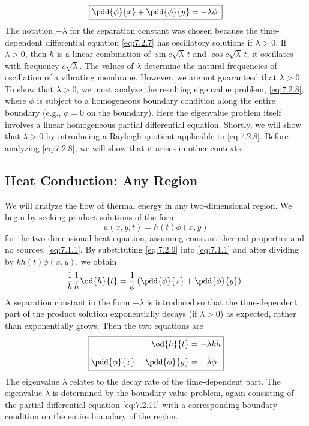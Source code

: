 \begin{equation}
\boxed{\pdd{\phi}{x} + \pdd{\phi}{y} = -\lambda\phi.}
\label{eq:7.2.8}
\end{equation}
The notation $-\lambda$ for the separation constant was chosen because the time-dependent differential equation \eqref{eq:7.2.7} has oscillatory solutions if $\lambda > 0$.  If $\lambda > 0$, then $h$ is a linear combination of $\sin c\sqrt{\lambda}\,t$ and $\cos c\sqrt{\lambda}\,t$; it oscillates with frequency $c\sqrt{\lambda}$.  The values of $\lambda$ determine the natural frequencies of oscillation of a vibrating membrane.  However, we are not guaranteed that $\lambda > 0$.  To show that $\lambda > 0$, we must analyze the resulting eigenvalue problem, \eqref{eq:7.2.8}, where $\phi$ is subject to a homogeneous boundary condition along the entire boundary (e.g., $\phi = 0$ on the boundary).  Here the eigenvalue problem itself involves a linear homogeneous partial differential equation.  Shortly, we will show that $\lambda > 0$ by introducing a Rayleigh quotient applicable to \eqref{eq:7.2.8}.  Before analyzing \eqref{eq:7.2.8}, we will show that it arises in other contexts.

\subsection{Heat Conduction: Any Region}
\label{sec:7.2.2}

We will analyze the flow of thermal energy in any two-dimensional region.  We begin by seeking product solutions of the form
\begin{equation}
\boxed{u(x,y,t) = h(t)\phi(x,y)}
\label{eq:7.2.9}
\end{equation}
for the two-dimensional heat equation, assuming constant thermal properties and no sources, \eqref{eq:7.1.1}.  By substituting \eqref{eq:7.2.9} into \eqref{eq:7.1.1} and after dividing by $kh(t)\phi(x,y)$, we obtain
\begin{equation}
\frac{1}{k}\frac{1}{h}\od{h}{t} = \frac{1}{\phi}\left(\pdd{\phi}{x} + \pdd{\phi}{y}\right).
\label{eq:7.2.10}
\end{equation}
A separation constant in the form $-\lambda$ is introduced so that the time-dependent part of the product solution exponentially decays (if $\lambda > 0$) as expected, rather than exponentially grows.  Then the two equations are
\begin{equation}
\boxed{\begin{aligned}
\od{h}{t} &= -\lambda k h \\[6pt]
\pdd{\phi}{x} + \pdd{\phi}{y} &= -\lambda\phi.
\end{aligned}}
\label{eq:7.2.11}
\end{equation}
The eigenvalue $\lambda$ relates to the decay rate of the time-dependent part.  The eigenvalue $\lambda$ is determined by the boundary value problem, again consisting of the partial differential equation \eqref{eq:7.2.11} with a corresponding boundary condition on the entire boundary of the region.

